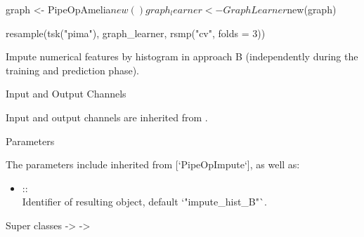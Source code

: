 \documentclass[letterpaper]{book}
\begin{document}
%
\begin{Examples}
\begin{ExampleCode}
{
  graph <- PipeOpAmelia$new() %
  graph_learner <- GraphLearner$new(graph)

  resample(tsk("pima"), graph_learner, rsmp("cv", folds = 3))
}
\end{ExampleCode}
\end{Examples}
%
\begin{Description}\relax
Impute numerical features by histogram in approach B (independently during the training and prediction phase).
\end{Description}
%
\begin{Section}{Input and Output Channels}

Input and output channels are inherited from .
\end{Section}
%
\begin{Section}{Parameters}

The parameters include inherited from [`PipeOpImpute`], as well as: \\{}
\begin{itemize}

\item{}  :: \\{}
Identifier of resulting object, default `"impute\_hist\_B"`.

\end{itemize}

\end{Section}
%
\begin{Section}{Super classes}
 ->  -> 
\end{Section}
%
\end{document}
